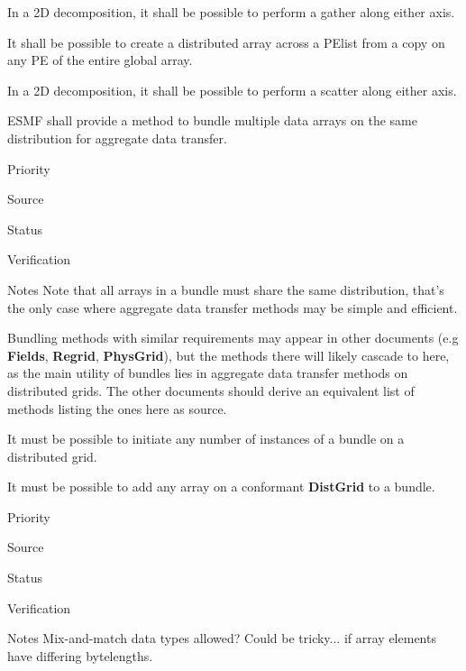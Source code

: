 In a 2D decomposition, it shall be possible to perform a gather along
either axis.


It shall be possible to create a distributed array across a PElist
from a copy on any PE of the entire global array.


In a 2D decomposition, it shall be possible to perform a scatter along
either axis.


ESMF shall provide a method to bundle multiple data arrays on the same
distribution for aggregate data transfer.

\begin{reqlist}
\item[Priority]
\item[Source]
\item[Status]
\item[Verification]
\item[Notes] Note that all arrays in a bundle must share the same
  distribution, that's the only case where aggregate data transfer
  methods may be simple and efficient.
  
  Bundling methods with similar requirements may appear in other
  documents (e.g \textbf{Fields}, \textbf{Regrid}, \textbf{PhysGrid}),
  but the methods there will likely cascade to here, as the main
  utility of bundles lies in aggregate data transfer methods on
  distributed grids. The other documents should derive an equivalent
  list of methods listing the ones here as source.
\end{reqlist}


It must be possible to initiate any number of instances of a bundle on
a distributed grid.


It must be possible to add any array on a conformant \textbf{DistGrid}
to a bundle.

\begin{reqlist}
\item[Priority]
\item[Source]
\item[Status]
\item[Verification]
\item[Notes] Mix-and-match data types allowed? Could be tricky... if
  array elements have differing bytelengths.
\end{reqlist}

